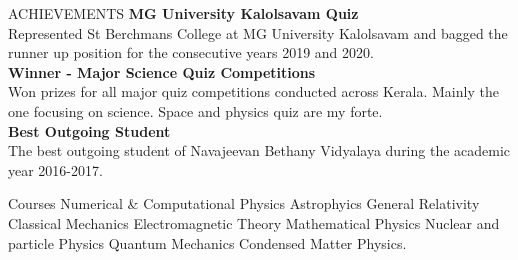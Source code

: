 \documentclass{resume} %
\begin{document}
\begin{rSection}{ACHIEVEMENTS }
\textbf{MG University Kalolsavam Quiz}\\
Represented St Berchmans College at MG University Kalolsavam and bagged the runner up position for the consecutive years 2019 and 2020. \\
\textbf{Winner - Major Science  Quiz Competitions }\\
Won prizes for all major quiz competitions conducted across Kerala. Mainly the one focusing on science. Space and physics quiz are my forte.\\
\textbf{Best Outgoing Student}\\
The best outgoing student of Navajeevan Bethany Vidyalaya during the academic year 2016-2017.\\
\end{rSection} 



\begin{rSection}{Courses}
	Numerical \& Computational Physics \textbar{} Astrophyics \textbar{} General Relativity \textbar{} Classical Mechanics \textbar{} Electromagnetic Theory \textbar{} Mathematical Physics \textbar{} Nuclear and particle Physics \textbar{}
	Quantum Mechanics \textbar{} Condensed Matter Physics.
\end{rSection}
\end{document}
